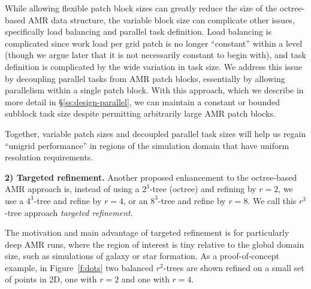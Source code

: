 \documentclass[10pt,twocolumn]{article}
\begin{document}

While allowing flexible patch block sizes can greatly reduce the size
of the octree-based AMR data structure, the variable block size can
complicate other issues, specifically load balancing and parallel task
definition.  Load balancing is complicated since work load per grid
patch is no longer ``constant'' within a level (though we argue later
that it is not necessarily constant to begin with), and task
definition is complicated by the wide variation in task size.  We
address this issue by decoupling parallel tasks from AMR patch blocks,
essentially by allowing parallelism within a single patch block.  With
this approach, which we describe in more detail in
\S\ref{ss:design-parallel}, we can maintain a constant or bounded
subblock task size despite permitting arbitrarily large AMR patch
blocks.  

Together, variable patch sizes and decoupled parallel task sizes will
help us regain ``unigrid performance'' in regions of the simulation
domain that have uniform resolution requirements.


\textbf{2) Targeted refinement.}  Another proposed enhancement to the
octree-based AMR approach is, instead of using a $2^3$-tree (octree)
and refining by $r=2$, we use a $4^3$-tree and refine by $r=4$, or an
$8^3$-tree and refine by $r=8$.  We call this $r^3$-tree approach
\textit{targeted refinement}.

The motivation and main advantage of targeted refinement is for
particularly deep AMR runs, where the region of interest is tiny
relative to the global domain size, such as simulations of galaxy or
star formation.  As a proof-of-concept example, in Figure~\ref{f:dots}
two balanced $r^2$-trees are shown refined on a small set of points in 2D, one
with $r=2$ and one with $r=4$.
\end{document}
